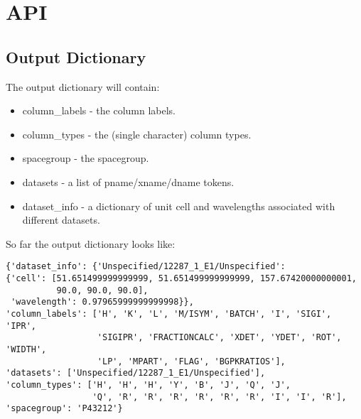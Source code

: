 \documentclass[a4paper, 11pt]{article}
\begin{document}
\section{API}

\subsection{Output Dictionary}

The output dictionary will contain:

\begin{itemize}
\item{column\_labels - the column labels.}
\item{column\_types - the (single character) column types.}
\item{spacegroup - the spacegroup.}
\item{datasets - a list of pname/xname/dname tokens.}
\item{dataset\_info - a dictionary of unit cell and wavelengths associated
with different datasets.}
\end{itemize}

So far the output dictionary looks like:

{
\tiny
\begin{verbatim}
{'dataset_info': {'Unspecified/12287_1_E1/Unspecified': 
{'cell': [51.651499999999999, 51.651499999999999, 157.67420000000001, 
          90.0, 90.0, 90.0], 
 'wavelength': 0.97965999999999998}}, 
'column_labels': ['H', 'K', 'L', 'M/ISYM', 'BATCH', 'I', 'SIGI', 'IPR', 
                  'SIGIPR', 'FRACTIONCALC', 'XDET', 'YDET', 'ROT', 'WIDTH', 
                  'LP', 'MPART', 'FLAG', 'BGPKRATIOS'], 
'datasets': ['Unspecified/12287_1_E1/Unspecified'], 
'column_types': ['H', 'H', 'H', 'Y', 'B', 'J', 'Q', 'J', 
                 'Q', 'R', 'R', 'R', 'R', 'R', 'R', 'I', 'I', 'R'], 
'spacegroup': 'P43212'}
\end{verbatim}
}
\end{document}
